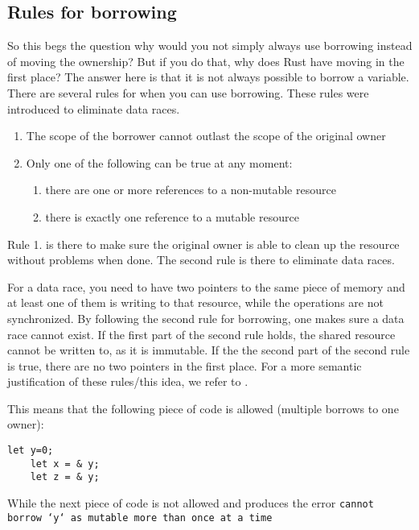 \subsection{Rules for borrowing}
So this begs the question why would you not simply always use borrowing instead of moving the ownership? But if you do that, why does Rust have moving in the first place? The answer here is that it is not always possible to borrow a variable. There are several rules for when you can use borrowing. These rules were introduced to eliminate data races. 
\begin{enumerate}[noitemsep]
    \item The scope of the borrower cannot outlast the scope of the original owner
\item Only one of the following can be true at any moment:
    \begin{enumerate}[noitemsep]
        \item there are one or more references to a non-mutable resource
        \item there is exactly one reference to a mutable resource
    \end{enumerate}
\end{enumerate}

Rule 1. is there to make sure the original owner is able to clean up the resource without problems when done. The second rule is there to eliminate data races. 

For a data race, you need to have two pointers to the same piece of memory and at least one of them is writing to that resource, while the operations are not synchronized. By following the second rule for borrowing, one makes sure a data race cannot exist. If the first part of the second rule holds, the shared resource cannot be written to, as it is immutable. If the the second part of the second rule is true, there are no two pointers in the first place. For a more semantic justification of these rules/this idea, we refer to \cite{boyland2003checking}.

This means that the following piece of code is allowed (multiple borrows to one owner):

\begin{verbatim}
let y=0;
	let x = & y; 
	let z = & y;
\end{verbatim}

While the next piece of code is not allowed and produces the error \texttt{cannot borrow `y` as mutable more than once at a time}

